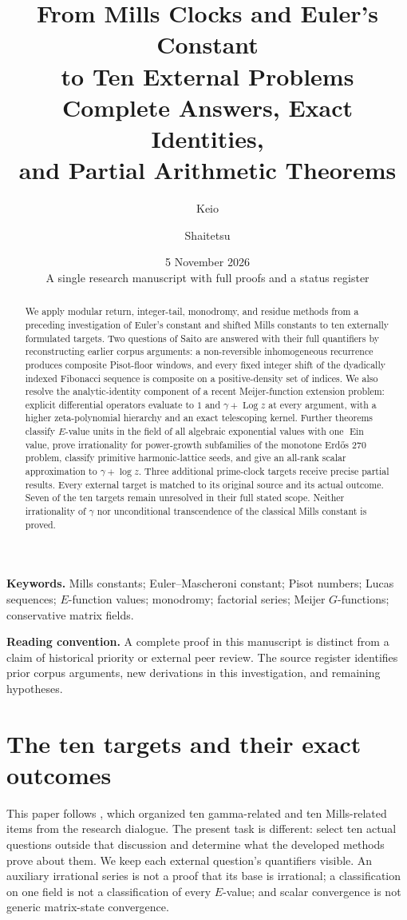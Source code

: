 \documentclass[11pt,a4paper]{article}
\title{\color{inkblue}\textbf{From Mills Clocks and Euler's Constant\\to Ten External Problems}\\[7pt]
\large Complete Answers, Exact Identities,\\and Partial Arithmetic Theorems}
\author{Keio \and Shaitetsu}
\date{5 November 2026\\[3pt]\small A single research manuscript with full proofs and a status register}
\numberwithin{equation}{section}
\theoremstyle{definition}
\theoremstyle{remark}
\DeclareMathOperator{\Log}{Log}
\begin{document}
\maketitle
\thispagestyle{empty}
\begin{abstract}
We apply modular return, integer-tail, monodromy, and residue methods
from a preceding investigation of Euler's constant and shifted Mills
constants to ten externally formulated targets. Two questions of Saito
are answered with their full quantifiers by reconstructing earlier
corpus arguments: a non-reversible inhomogeneous recurrence produces
composite Pisot-floor windows, and every fixed integer shift of the
dyadically indexed Fibonacci sequence is composite on a positive-density
set of indices. We also resolve the analytic-identity component of a
recent Meijer-function extension problem: explicit differential operators
evaluate to $1$ and $\gamma+\Log z$ at every argument, with a higher
zeta-polynomial hierarchy and an exact telescoping kernel. Further
theorems classify $E$-value units in the field of all algebraic exponential
values with one $\operatorname{Ein}$ value, prove irrationality for
power-growth subfamilies of the monotone Erd\H{o}s 270 problem, classify
primitive harmonic-lattice seeds, and give an all-rank scalar approximation
to $\gamma+\log z$. Three additional prime-clock targets receive precise
partial results. Every external target is matched to its original source
and its actual outcome. Seven of the ten targets remain unresolved in
their full stated scope. Neither irrationality of $\gamma$ nor
unconditional transcendence of the classical Mills constant is proved.
\end{abstract}
\vfill
\noindent\textbf{Keywords.} Mills constants; Euler--Mascheroni constant;
Pisot numbers; Lucas sequences; $E$-function values; monodromy;
factorial series; Meijer $G$-functions; conservative matrix fields.

\medskip
\noindent\textbf{Reading convention.} A complete proof in this manuscript
is distinct from a claim of historical priority or external peer review.
The source register identifies prior corpus arguments, new derivations
in this investigation, and remaining hypotheses.
\clearpage
\tableofcontents
\clearpage

\section{The ten targets and their exact outcomes}
\label{ext:register}

This paper follows \cite{Integrated2026}, which organized ten
gamma-related and ten Mills-related items from the research dialogue.
The present task is different: select ten actual questions outside that
discussion and determine what the developed methods prove about them.
We keep each external question's quantifiers visible. An auxiliary
irrational series is not a proof that its base is irrational; a
classification on one field is not a classification of every $E$-value;
and scalar convergence is not generic matrix-state convergence.
\end{document}
